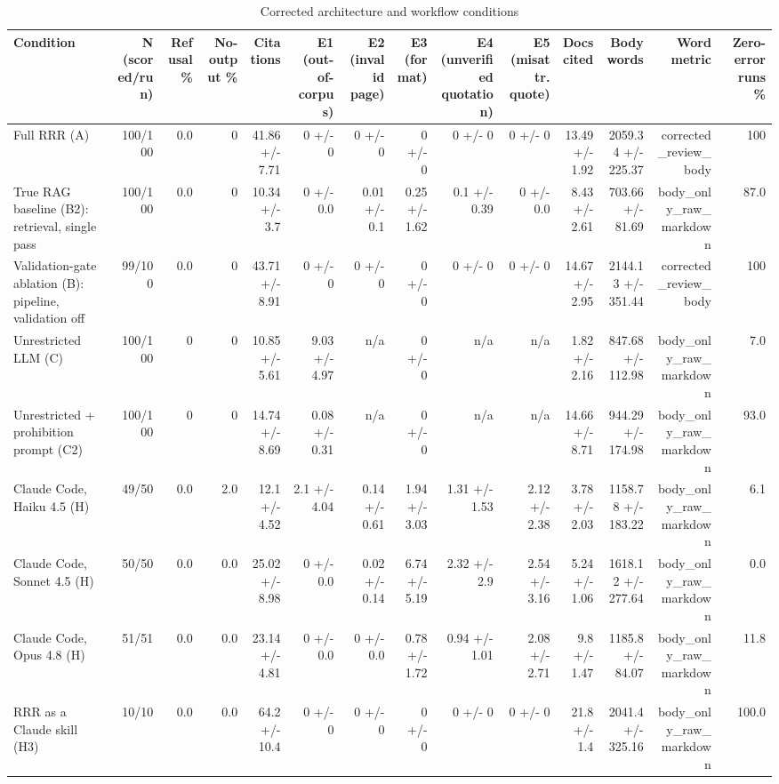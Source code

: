 \begin{table}[ht]
\centering
\caption{Corrected architecture and workflow conditions}
\scriptsize
\begin{tabular}{lrrrrrrrrrrrrr}
\toprule
Condition & N (scored/run) & Refusal \% & No-output \% & Citations & E1 (out-of-corpus) & E2 (invalid page) & E3 (format) & E4 (unverified quotation) & E5 (misattr. quote) & Docs cited & Body words & Word metric & Zero-error runs \% \\
\midrule
Full RRR (A) & 100/100 & 0.0 & 0 & 41.86 +/- 7.71 & 0 +/- 0 & 0 +/- 0 & 0 +/- 0 & 0 +/- 0 & 0 +/- 0 & 13.49 +/- 1.92 & 2059.34 +/- 225.37 & corrected\_review\_body & 100 \\
True RAG baseline (B2): retrieval, single pass & 100/100 & 0.0 & 0 & 10.34 +/- 3.7 & 0 +/- 0.0 & 0.01 +/- 0.1 & 0.25 +/- 1.62 & 0.1 +/- 0.39 & 0 +/- 0.0 & 8.43 +/- 2.61 & 703.66 +/- 81.69 & body\_only\_raw\_markdown & 87.0 \\
Validation-gate ablation (B): pipeline, validation off & 99/100 & 0.0 & 0 & 43.71 +/- 8.91 & 0 +/- 0 & 0 +/- 0 & 0 +/- 0 & 0 +/- 0 & 0 +/- 0 & 14.67 +/- 2.95 & 2144.13 +/- 351.44 & corrected\_review\_body & 100 \\
Unrestricted LLM (C) & 100/100 & 0 & 0 & 10.85 +/- 5.61 & 9.03 +/- 4.97 & n/a & 0 +/- 0 & n/a & n/a & 1.82 +/- 2.16 & 847.68 +/- 112.98 & body\_only\_raw\_markdown & 7.0 \\
Unrestricted + prohibition prompt (C2) & 100/100 & 0 & 0 & 14.74 +/- 8.69 & 0.08 +/- 0.31 & n/a & 0 +/- 0 & n/a & n/a & 14.66 +/- 8.71 & 944.29 +/- 174.98 & body\_only\_raw\_markdown & 93.0 \\
Claude Code, Haiku 4.5 (H) & 49/50 & 0.0 & 2.0 & 12.1 +/- 4.52 & 2.1 +/- 4.04 & 0.14 +/- 0.61 & 1.94 +/- 3.03 & 1.31 +/- 1.53 & 2.12 +/- 2.38 & 3.78 +/- 2.03 & 1158.78 +/- 183.22 & body\_only\_raw\_markdown & 6.1 \\
Claude Code, Sonnet 4.5 (H) & 50/50 & 0.0 & 0.0 & 25.02 +/- 8.98 & 0 +/- 0.0 & 0.02 +/- 0.14 & 6.74 +/- 5.19 & 2.32 +/- 2.9 & 2.54 +/- 3.16 & 5.24 +/- 1.06 & 1618.12 +/- 277.64 & body\_only\_raw\_markdown & 0.0 \\
Claude Code, Opus 4.8 (H) & 51/51 & 0.0 & 0.0 & 23.14 +/- 4.81 & 0 +/- 0.0 & 0 +/- 0.0 & 0.78 +/- 1.72 & 0.94 +/- 1.01 & 2.08 +/- 2.71 & 9.8 +/- 1.47 & 1185.8 +/- 84.07 & body\_only\_raw\_markdown & 11.8 \\
RRR as a Claude skill (H3) & 10/10 & 0.0 & 0.0 & 64.2 +/- 10.4 & 0 +/- 0 & 0 +/- 0 & 0 +/- 0 & 0 +/- 0 & 0 +/- 0 & 21.8 +/- 1.4 & 2041.4 +/- 325.16 & body\_only\_raw\_markdown & 100.0 \\
\bottomrule
\end{tabular}
\end{table}
